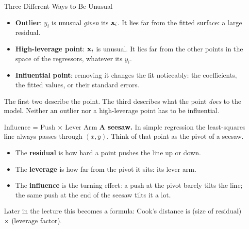 \begin{frame}{Three Different Ways to Be Unusual}
    \begin{itemize}
        \item \textbf{Outlier}: $y_i$ is unusual \emph{given} its $\mathbf{x}_i$. It lies far from the fitted surface: a large residual.
        \item \textbf{High-leverage point}: $\mathbf{x}_i$ is unusual. It lies far from the other points in the space of the regressors, whatever its $y_i$.
        \item \textbf{Influential point}: removing it changes the fit noticeably: the coefficients, the fitted values, or their standard errors.
    \end{itemize}
    \svspace{0.5em}
    The first two describe the point. The third describes what the point \emph{does} to the model. Neither an outlier nor a high-leverage point has to be influential.
\end{frame}


\begin{frame}{Influence = Push $\times$ Lever Arm}
    \textbf{A seesaw.} In simple regression the least-squares line always passes through $(\bar x,\bar y)$. Think of that point as the pivot of a seesaw.
    \svspace{0.3em}
    \begin{itemize}
        \item The \textbf{residual} is how hard a point pushes the line up or down.
        \item The \textbf{leverage} is how far from the pivot it sits: its lever arm.
        \item The \textbf{influence} is the turning effect: a push at the pivot barely tilts the line; the same push at the end of the seesaw tilts it a lot.
    \end{itemize}
    \svspace{0.3em}
    Later in the lecture this becomes a formula: Cook's distance is (size of residual) $\times$ (leverage factor).
\end{frame}


